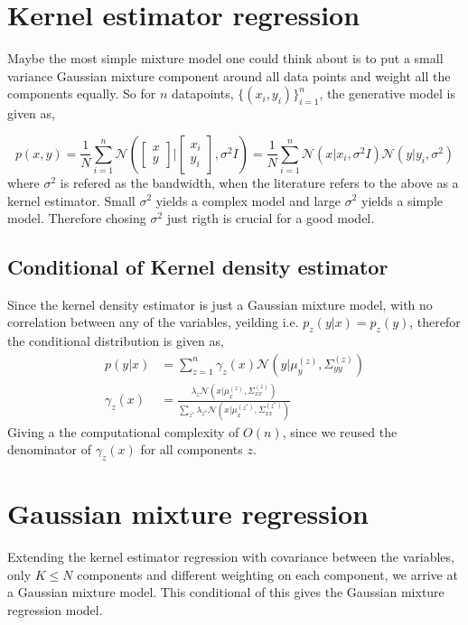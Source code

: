\section{Kernel estimator regression}
Maybe the most simple mixture model one could think about is to put a small variance Gaussian mixture
component around all data points and weight all the components equally. So for $n$ datapoints,
$\{(x_i,y_i)\}_{i=1}^n$, the generative model is given as, 

$$p(x,y) = \frac{1}{N} \sum_{i=1}^n \mathcal{N}\left(\begin{bmatrix}x\\y\end{bmatrix} |
\begin{bmatrix}x_i\\y_i\end{bmatrix}, \sigma^2 I \right) = \frac{1}{N} \sum_{i=1}^n 
\mathcal{N}(x|x_i, \sigma^2 I)\mathcal{N}(y|y_i, \sigma^2) $$
where $\sigma^2$ is refered as the bandwidth, when the literature refers to the above as a kernel estimator. 
Small $\sigma^2$ yields a complex model and large $\sigma^2$ yields a simple model. Therefore chosing $\sigma^2$
just rigth is crucial for a good model. 


\subsection{Conditional of Kernel density estimator}
Since the kernel density estimator is just a Gaussian mixture model, with no correlation between
any of the variables, yeilding i.e. $p_z(y|x) = p_z(y)$, therefor the conditional distribution is
given as, 
\begin{align}
    p(y|x) &= \sum_{z=1}^n \gamma_z(x) \mathcal{N}(y|\mu_{y}^{(z)},\Sigma_{yy}^{(z)} )\\
    \gamma_z(x) &= \frac{\lambda_z \mathcal{N}(x|\mu_{x}^{(z)},\Sigma_{xx}^{(z)})}{\sum_{z^*}
\lambda_{z^*} \mathcal{N}(x|\mu_{x}^{(z^*)},\Sigma_{xx}^{(z^*)})}
\end{align}
Giving a the computational complexity of $O(n)$, since we reused the denominator of 
$\gamma_z(x)$ for all components $z$. 

\section{Gaussian mixture regression}
Extending the kernel estimator regression with covariance between the variables, only $K \leq N$ components 
and different weighting on each component, we arrive at a Gaussian mixture model. This conditional of this
gives the Gaussian mixture regression model. 

